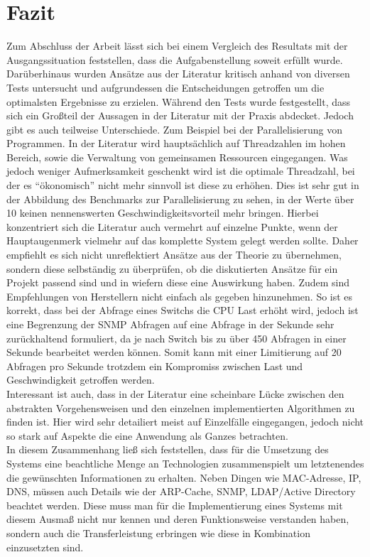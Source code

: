\chapter{Fazit}
\label{cha:Fazit}

Zum Abschluss der Arbeit lässt sich bei einem Vergleich des Resultats mit der Ausgangssituation feststellen, dass die Aufgabenstellung soweit erfüllt wurde. Darüberhinaus wurden Ansätze aus der Literatur kritisch anhand von diversen Tests untersucht und aufgrundessen die Entscheidungen getroffen um die optimalsten Ergebnisse zu erzielen.
Während den Tests wurde festgestellt, dass sich ein Großteil der Aussagen in der Literatur mit der Praxis abdecket. Jedoch gibt es auch teilweise Unterschiede. Zum Beispiel bei der Parallelisierung von Programmen. In der Literatur wird hauptsächlich auf Threadzahlen im hohen Bereich, sowie die Verwaltung von gemeinsamen Ressourcen eingegangen. Was jedoch weniger Aufmerksamkeit geschenkt wird ist die optimale Threadzahl, bei der es “ökonomisch” nicht mehr sinnvoll ist diese zu erhöhen. Dies ist sehr gut in der Abbildung des Benchmarks zur Parallelisierung zu sehen, in der Werte über 10 keinen nennenswerten Geschwindigkeitsvorteil mehr bringen. Hierbei konzentriert sich die Literatur auch vermehrt auf einzelne Punkte, wenn der Hauptaugenmerk vielmehr auf das komplette System gelegt werden sollte. Daher empfiehlt es sich nicht unreflektiert Ansätze aus der Theorie zu übernehmen, sondern diese selbständig zu überprüfen, ob die diskutierten Ansätze für ein Projekt passend sind und in wiefern diese eine Auswirkung haben.
Zudem sind Empfehlungen von Herstellern nicht einfach als gegeben hinzunehmen. So ist es korrekt, dass bei der Abfrage eines Switchs die CPU Last erhöht wird, jedoch ist eine Begrenzung der SNMP Abfragen auf eine Abfrage in der Sekunde sehr zurückhaltend formuliert, da je nach Switch bis zu über 450 Abfragen in einer Sekunde bearbeitet werden können. Somit kann mit einer Limitierung auf 20 Abfragen pro Sekunde trotzdem ein Kompromiss zwischen Last und Geschwindigkeit getroffen werden.\\
Interessant ist auch, dass in der Literatur eine scheinbare Lücke zwischen den abstrakten Vorgehensweisen und den einzelnen implementierten Algorithmen zu finden ist. Hier wird sehr detailiert meist auf Einzelfälle eingegangen, jedoch nicht so stark auf Aspekte die eine Anwendung als Ganzes betrachten.\\
In diesem Zusammenhang ließ sich feststellen, dass für die Umsetzung des Systems eine beachtliche Menge an Technologien zusammenspielt um letztenendes die gewünschten Informationen zu erhalten. Neben Dingen wie MAC-Adresse, IP, DNS, müssen auch Details wie der ARP-Cache, SNMP, LDAP/Active Directory beachtet werden. Diese muss man für die Implementierung eines Systems mit diesem Ausmaß nicht nur kennen und deren Funktionsweise verstanden haben, sondern auch die Transferleistung erbringen wie diese in Kombination einzusetzten sind.\\
